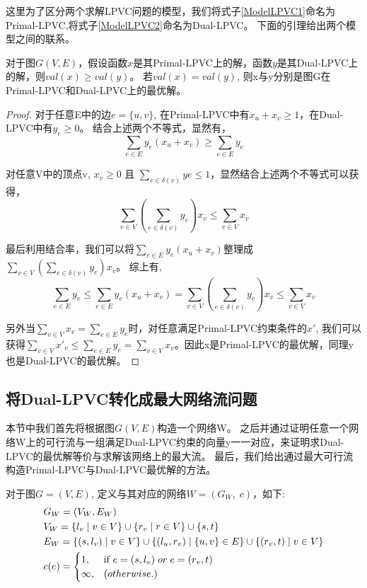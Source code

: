 这里为了区分两个求解LPVC问题的模型，我们将式子\ref{ModelLPVC1}命名为Primal-LPVC,将式子\ref{ModelLPVC2}命名为Dual-LPVC。
下面的引理给出两个模型之间的联系。
\begin{lemma} \label{relationBwtPrimalAndDual}
对于图$G(V, E)$，假设函数$x$是其Primal-LPVC上的解，函数$y$是其Dual-LPVC上的解，则$val(x) \ge val(y)$。
若$val(x) = val(y)$, 则x与y分别是图G在Primal-LPVC和Dual-LPVC上的最优解。
\end{lemma}
\begin{proof}
  对于任意E中的边$e = \{u, v\}$, 在Primal-LPVC中有$x_u + x_v \ge 1$，在Dual-LPVC中有$y_e \ge 0$。
  结合上述两个不等式，显然有，\[\sum\limits_{e \in E}{y_e(x_u + x_v)} \ge \sum\limits_{e \in E}{y_e}\]

  对任意V中的顶点v, $x_v \ge 0$ 且 $\sum_{e \in \delta(v)}{ye} \le 1$，显然结合上述两个不等式可以获得，
  \[\sum\limits_{v \in V}{(\sum\limits_{e \in \delta(v)}{y_e})x_v} \le \sum\limits_{v \in V}{x_v}\]

  最后利用结合率，我们可以将$\sum_{e \in E}{y_e(x_u + x_v)}$整理成$\sum_{v \in V}{(\sum_{e \in \delta(v)}{y_e})x_v}$。
  综上有,
  \[
    \sum_{e \in E}{y_e} \le \sum_{e \in E}{y_e(x_u + x_v)}  = \sum_{v \in V}{(\sum_{e \in \delta(v)}{y_e})x_v} \le \sum_{v \in V}{x_v}
  \]

  另外当$\sum\limits_{v \in V}{x_v} = \sum\limits_{e \in E}{y_e}$时，对任意满足Primal-LPVC约束条件的$x'$,
  我们可以获得$\sum\limits_{v \in V}{x'_v} \le \sum\limits_{e \in E}{y_e} = \sum\limits_{v \in V}{x_v}$。因此x是Primal-LPVC的最优解，同理y也是Dual-LPVC的最优解。
\end{proof}

\subsection{将Dual-LPVC转化成最大网络流问题} \label{TransformToNetwork}
本节中我们首先将根据图$G(V, E)$构造一个网络W。
之后并通过证明任意一个网络W上的可行流与一组满足Dual-LPVC约束的向量y一一对应，来证明求Dual-LPVC的最优解等价与求解该网络上的最大流。
最后，我们给出通过最大可行流构造Primal-LPVC与Dual-LPVC最优解的方法。

\begin{definition}
对于图$G = (V, E)$, 定义与其对应的网络$W = (G_W,\; c)$，如下:
\begin{equation*}\begin{aligned}
    &G_W = (V_W, E_W) \\
    &V_W = \{l_v\;|\;v \in V\} \cup \{r_v\;|\;r \in V\} \cup \{ s, t \} \\
    &E_W = \{(s, l_v)\;|\;v \in V\} \cup \{(l_u, r_v)\;|\;\{u, v\} \in E\} \cup \{(r_v, t)\;|\;v \in V\}\\
    &c(e) =   \begin{cases}
        1, & \mbox{if } e = (s, l_v)\;or\;e = (r_v, t)\\
        \infty, & \mbox(otherwise.)\\
  \end{cases}
\end{aligned}\end{equation*}
\end{definition}

